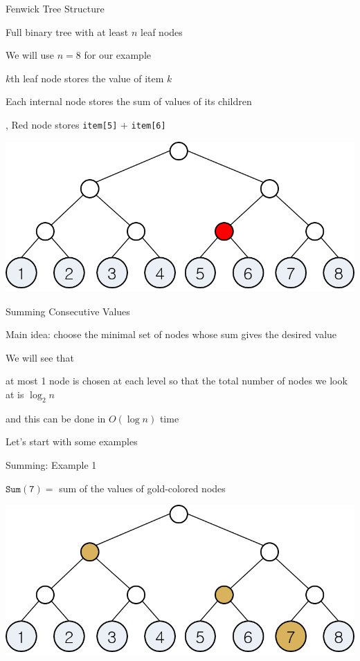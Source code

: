 \documentclass[13pt,onlymath]{beamer}
\begin{document}
\begin{frame}[fragile]{Fenwick Tree Structure}
\BIT
\item Full binary tree with at least $n$ leaf nodes
\BIT
\item We will use $n=8$ for our example
\EIT
\item $k$th leaf node stores the value of item $k$
\item Each internal node stores the sum of values of its children
\BIT
\item \eg, Red node stores \verb.item[5]. $+$ \verb.item[6].
\EIT
\EIT
\begin{center}
\includegraphics[height=0.4\textheight]{figures/fenwick}
\end{center}
\end{frame}

\begin{frame}{Summing Consecutive Values}
\BIT
\item Main idea: choose the minimal set of nodes whose sum gives the desired value
\item We will see that
\BIT
\item at most 1 node is chosen at each level so that the total number of nodes we look at is $\log_2 n$
\item and this can be done in $O(\log n)$ time
\EIT
\vfill
\item Let's start with some examples
\EIT
\end{frame}

\begin{frame}[fragile]{Summing: Example 1}
\BIT
\item $\mathtt{Sum(7)} = $ sum of the values of gold-colored nodes
\EIT
\begin{center}
\includegraphics[height=0.4\textheight]{figures/fenwick_sum1}
\end{center}
\end{frame}
\end{document}
